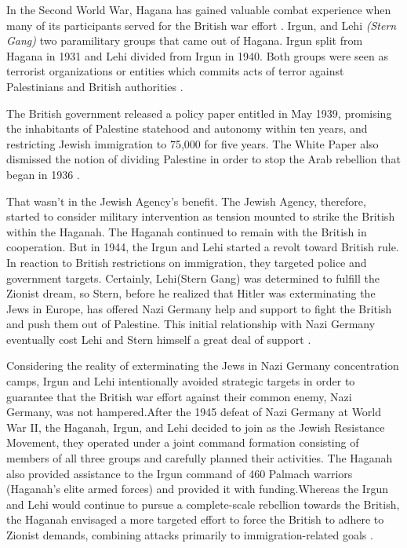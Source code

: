 In the Second World War, Hagana has gained valuable combat experience when many of its participants served for the British war effort \citep{Pappe2006}. Irgun, and Lehi \textit{(Stern Gang)} two paramilitary groups that came out of Hagana. Irgun split from Hagana in 1931 and Lehi divided from Irgun in 1940\citep{Shlaim2014}. Both groups were seen as terrorist organizations or entities which commits acts of terror against Palestinians and British authorities \citep{Bell1976}.   


The British government released a policy paper entitled  in May 1939, promising the inhabitants of Palestine statehood and autonomy within ten years, and restricting Jewish immigration to 75,000 for five years. The White Paper also dismissed the notion of dividing Palestine in order to stop the Arab rebellion that began in 1936 \citep{Morris2004, Fenby2018}.

That wasn't in the Jewish Agency's benefit. The Jewish Agency, therefore, started to consider military intervention as tension mounted to strike the British within the Haganah. The Haganah continued to remain with the British in cooperation. But in 1944, the Irgun and Lehi started a revolt toward British rule. In reaction to British restrictions on immigration, they targeted police and government targets.
Certainly, Lehi(Stern Gang) was determined to fulfill the Zionist dream, so Stern, before he realized that Hitler was exterminating the Jews in Europe, has offered Nazi Germany help and support to fight the British and push them out of Palestine. This initial relationship with Nazi Germany eventually cost Lehi and Stern himself a great deal of support \citep{Shlaim2014, Heller1995, Grob-Fitzgibbon2011}. 

Considering the reality of exterminating the Jews in Nazi Germany concentration camps, Irgun and Lehi intentionally avoided strategic targets in order to guarantee that the British war effort against their common enemy, Nazi Germany, was not hampered.After the 1945 defeat of Nazi Germany at World War II, the Haganah, Irgun, and Lehi decided to join as the Jewish Resistance Movement, they operated under a joint command formation consisting of members of all three groups and carefully planned their activities. The Haganah also provided assistance to the Irgun command of 460 Palmach warriors (Haganah's elite armed forces) and provided it with funding.Whereas the Irgun and Lehi would continue to pursue a complete-scale rebellion towards the British, the Haganah envisaged a more targeted effort to force the British to adhere to Zionist demands, combining attacks primarily to immigration-related goals \citep{Bell1976, Shlaim2014}.

